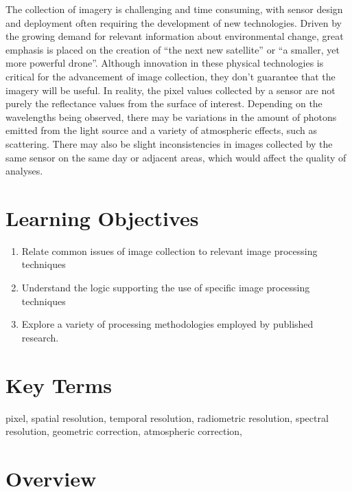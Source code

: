 \documentclass[
]{book}
\providecommand{\tightlist}{%
  \setlength{\itemsep}{0pt}\setlength{\parskip}{0pt}}
\begin{document}
The collection of imagery is challenging and time consuming, with sensor
design and deployment often requiring the development of new
technologies. Driven by the growing demand for relevant information
about environmental change, great emphasis is placed on the creation of
``the next new satellite'' or ``a smaller, yet more powerful drone''.
Although innovation in these physical technologies is critical for the
advancement of image collection, they don't guarantee that the imagery
will be useful. In reality, the pixel values collected by a sensor are
not purely the reflectance values from the surface of interest.
Depending on the wavelengths being observed, there may be variations in
the amount of photons emitted from the light source and a variety of
atmospheric effects, such as scattering. There may also be slight
inconsistencies in images collected by the same sensor on the same day
or adjacent areas, which would affect the quality of analyses.

\hypertarget{learning-objectives-12}{%
\section*{Learning Objectives}\label{learning-objectives-12}}

\begin{enumerate}
\def\labelenumi{\arabic{enumi}.}
\tightlist
\item
  Relate common issues of image collection to relevant image
  processing techniques
\item
  Understand the logic supporting the use of specific image processing
  techniques
\item
  Explore a variety of processing methodologies employed by published
  research.
\end{enumerate}

\hypertarget{key-terms-12}{%
\section*{Key Terms}\label{key-terms-12}}

pixel, spatial resolution, temporal resolution, radiometric resolution,
spectral resolution, geometric correction, atmospheric correction,

\hypertarget{overview}{%
\section{Overview}\label{overview}}
\end{document}

